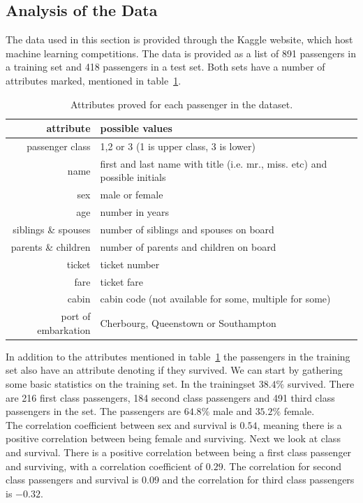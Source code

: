 \documentclass{llncs}
\begin{document}
\subsection*{Analysis of the Data}
The data used in this section is provided through the Kaggle website, which host machine learning competitions. The data is provided as a list of 891 passengers in a training set and 418 passengers in a test set. Both sets have a number of attributes marked, mentioned in table~\ref{tab:passenger_attributes}.
\begin{table}[H]
\caption{Attributes proved for each passenger in the dataset.}
\label{tab:passenger_attributes}
\centering
\begin{tabular}{ r | l }
  attribute & possible values \\ \hline \hline
  passenger class & 1,2 or 3 (1 is upper class, 3 is lower)  \\
  name & first and last name with title (i.e. mr., miss. etc) and possible initials  \\
  sex & male or female \\
  age & number in years \\
  siblings \& spouses & number of siblings and spouses on board \\
  parents \& children & number of parents and children on board \\
  ticket & ticket number \\
  fare & ticket fare \\
  cabin & cabin code (not available for some, multiple for some)\\
  port of embarkation & Cherbourg, Queenstown or Southampton
\end{tabular}
\end{table}
In addition to the attributes mentioned in table~\ref{tab:passenger_attributes} the passengers in the training set also have an attribute denoting if they survived.  We can start by gathering some basic statistics on the training set. In the trainingset $38.4\%$ survived. There are 216 first class passengers, 184 second class passengers and 491 third class passengers in the set. The passengers are $64.8\%$ male and $35.2\%$ female.\\
The correlation coefficient between sex and survival is $0.54$, meaning there is a positive correlation between being female and surviving. Next we look at class and survival. There is a positive correlation between being a first class passenger and surviving, with a correlation coefficient of $0.29$. The correlation for second class passengers and survival is $0.09$ and the correlation for third class passengers is $-0.32$.\\
\end{document}
